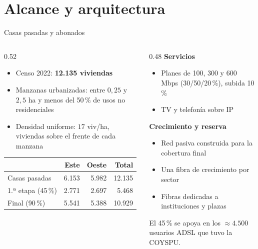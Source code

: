 \section[P2: Alcance]{Alcance y arquitectura}
\begin{frame}{Casas pasadas y abonados}
  \begin{columns}[T]
    \begin{column}{0.52\textwidth}
      \small
      \begin{itemize}
        \item Censo 2022: \textbf{12.135 viviendas}
        \item Manzanas urbanizadas: entre $0{,}25$ y $2{,}5$ ha y menos del 50\,\% de usos no residenciales
        \item Densidad uniforme: $17$ viv/ha, viviendas sobre el frente de cada manzana
      \end{itemize}
      \vspace{0.1cm}
      \footnotesize
      \begin{tabular}{lrrr}
        \toprule
        & \textbf{Este} & \textbf{Oeste} & \textbf{Total} \\
        \midrule
        Casas pasadas & 6.153 & 5.982 & 12.135 \\
        1.ª etapa (45\,\%) & 2.771 & 2.697 & 5.468 \\
        Final (90\,\%) & 5.541 & 5.388 & 10.929 \\
        \bottomrule
      \end{tabular}
    \end{column}
    \begin{column}{0.48\textwidth}
      \small
      \textbf{Servicios}
      \begin{itemize}
        \item Planes de 100, 300 y 600 Mbps (30/50/20\,\%), subida 10\,\%
        \item TV y telefonía sobre IP
      \end{itemize}
      \textbf{Crecimiento y reserva}
      \begin{itemize}
        \item Red pasiva construida para la cobertura final
        \item Una fibra de crecimiento por sector
        \item Fibras dedicadas a instituciones y plazas
      \end{itemize}
      \footnotesize El 45\,\% se apoya en los $\approx 4.500$ usuarios ADSL que tuvo la COYSPU.

\end{column}
\end{columns}
\end{frame}
